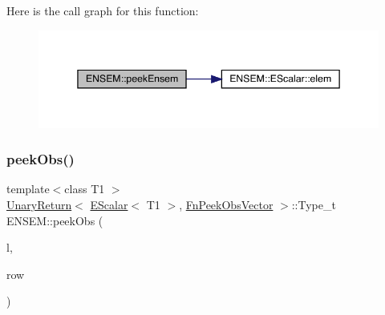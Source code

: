 Here is the call graph for this function\+:
\nopagebreak
\begin{figure}[H]
\begin{center}
\leavevmode
\includegraphics[width=345pt]{d4/dca/group__escalar_ga8fd0207eefa0fd0836dc3f2dffef209e_cgraph}
\end{center}
\end{figure}
\mbox{\label{group__escalar_ga7b3199ffdfb57391566d3db05e9b38c1}} 
\subsubsection{\texorpdfstring{peekObs()}{peekObs()}\hspace{0.1cm}{\footnotesize\ttfamily [1/2]}}
{\footnotesize\ttfamily template$<$class T1 $>$ \\
\mbox{\hyperlink{structENSEM_1_1UnaryReturn}{Unary\+Return}}$<$ \mbox{\hyperlink{classENSEM_1_1EScalar}{E\+Scalar}}$<$ T1 $>$, \mbox{\hyperlink{structENSEM_1_1FnPeekObsVector}{Fn\+Peek\+Obs\+Vector}} $>$\+::Type\+\_\+t E\+N\+S\+E\+M\+::peek\+Obs (\begin{DoxyParamCaption}\item[{const \mbox{\hyperlink{classENSEM_1_1EScalar}{E\+Scalar}}$<$ T1 $>$ \&}]{l,  }\item[{int}]{row }\end{DoxyParamCaption})\hspace{0.3cm}{\ttfamily [inline]}}


